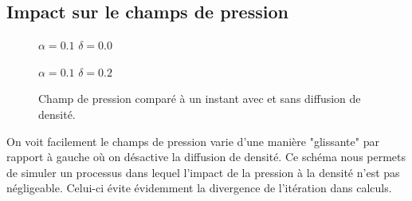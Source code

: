 \documentclass{article}
\begin{document}
\subsection{Impact sur le champs de pression}
\begin{figure}[h]
	\begin{minipage}[h]{0.49\linewidth}
		{$\alpha=0.1$ $\delta=0.0$}
	\end{minipage}
	\hfill
	\begin{minipage}[h]{0.49\linewidth}
		{$\alpha=0.1$ $\delta=0.2$}
	\end{minipage}
	\caption{Champ de pression comparé à un instant avec et sans diffusion de densité.}
\end{figure}
On voit facilement le champs de pression varie d'une manière "glissante" par rapport à gauche où on désactive la diffusion de densité. Ce schéma nous permets de simuler un processus dans lequel l'impact de la pression à la densité n'est pas négligeable. Celui-ci évite évidemment la divergence de l'itération dans calculs.
\end{document}
